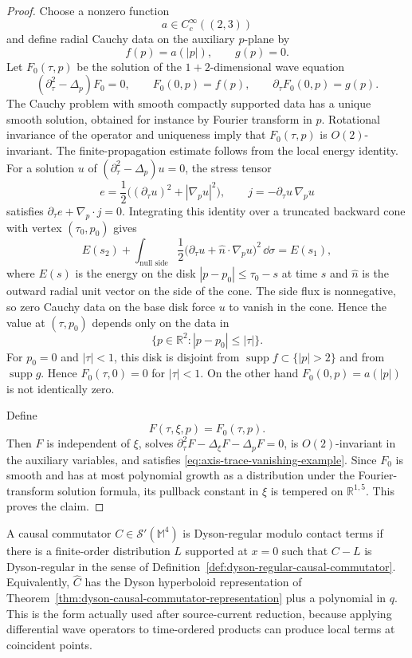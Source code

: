 \begin{proof}
Choose a nonzero function
\[
  a\in C_c^\infty((2,3))
\]
and define radial Cauchy data on the auxiliary \(p\)-plane by
\[
  f(p)=a(|p|),
  \qquad
  g(p)=0 .
\]
Let \(F_0(\tau,p)\) be the solution of the \(1+2\)-dimensional wave equation
\[
  (\partial_\tau^2-\Delta_p)F_0=0,
  \qquad
  F_0(0,p)=f(p),\qquad
  \partial_\tau F_0(0,p)=g(p).
\]
The Cauchy problem with smooth compactly supported data has a unique smooth
solution, obtained for instance by Fourier transform in \(p\).  Rotational
invariance of the operator and uniqueness imply that \(F_0(\tau,p)\) is
\(O(2)\)-invariant.  The finite-propagation estimate follows from the local
energy identity.  For a solution \(u\) of
\((\partial_\tau^2-\Delta_p)u=0\), the stress tensor
\[
  e=\frac12\bigl((\partial_\tau u)^2+|\nabla_pu|^2\bigr),
  \qquad
  j=-\partial_\tau u\,\nabla_pu
\]
satisfies \(\partial_\tau e+\nabla_p\cdot j=0\).  Integrating this identity
over a truncated backward cone with vertex \((\tau_0,p_0)\) gives
\[
  E(s_2)+\int_{\text{null side}}\frac12
  \bigl(\partial_\tau u+\hat n\cdot\nabla_pu\bigr)^2\,\dd\sigma
  =
  E(s_1),
\]
where \(E(s)\) is the energy on the disk
\(|p-p_0|\le \tau_0-s\) at time \(s\) and \(\hat n\) is the outward radial
unit vector on the side of the cone.  The side flux is nonnegative, so zero
Cauchy data on the base disk force \(u\) to vanish in the cone.  Hence the
value at \((\tau,p_0)\) depends only on the data in
\[
  \{p\in\mathbb R^2: |p-p_0|\le |\tau|\}.
\]
For \(p_0=0\) and \(|\tau|<1\), this disk is disjoint from
\(\operatorname{supp}f\subset\{|p|>2\}\) and from
\(\operatorname{supp}g\).  Hence \(F_0(\tau,0)=0\) for \(|\tau|<1\).
On the other hand \(F_0(0,p)=a(|p|)\) is not identically zero.

Define
\[
  F(\tau,\xi,p)=F_0(\tau,p).
\]
Then \(F\) is independent of \(\xi\), solves
\(\partial_\tau^2F-\Delta_\xi F-\Delta_pF=0\), is \(O(2)\)-invariant in
the auxiliary variables, and satisfies
\eqref{eq:axis-trace-vanishing-example}.  Since \(F_0\) is smooth and has at
most polynomial growth as a distribution under the Fourier-transform solution
formula, its pullback constant in \(\xi\) is tempered on
\(\mathbb R^{1,5}\).  This proves the claim.
\end{proof}

\begin{definition}
\label{def:dyson-regular-modulo-contact}
A causal commutator \(C\in\mathcal S'(\mathbb M^4)\) is Dyson-regular
modulo contact terms if there is a finite-order distribution \(L\) supported
at \(x=0\) such that \(C-L\) is Dyson-regular in the sense of
Definition~\ref{def:dyson-regular-causal-commutator}.  Equivalently,
\(\widehat C\) has the Dyson hyperboloid representation of
Theorem~\ref{thm:dyson-causal-commutator-representation} plus a polynomial in
\(q\).  This is the form actually used after source-current reduction,
because applying differential wave operators to time-ordered products can
produce local terms at coincident points.
\end{definition}

